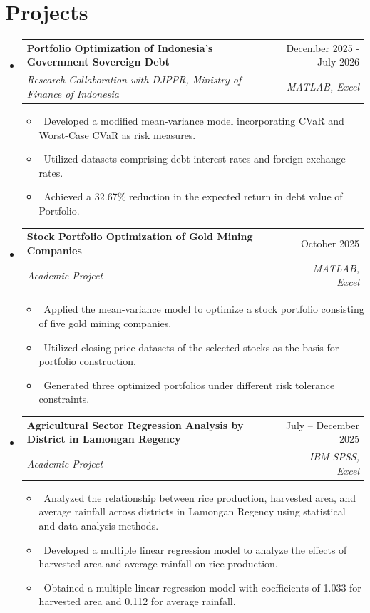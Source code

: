 \documentclass[letterpaper,10pt]{article}
\makeatletter
\newcommand{\resumeItem}[1]{\item\small{#1}}
\newcommand{\resumeSubheading}[4]{
\vspace{-1pt}\item
  \begin{tabular*}{0.97\textwidth}[t]{l@{\extracolsep{\fill}}r}
    \textbf{#1} & #2 \\
    \textit{#3} & \textit{#4} \\
  \end{tabular*}\vspace{-7pt}
}
\newcommand{\resumeSubHeadingList}{\begin{itemize}[leftmargin=0.15in, label={}]}
\newcommand{\resumeSubHeadingListEnd}{\end{itemize}}
\makeatother
\begin{document}
\section{Projects}
\resumeSubHeadingList
  \resumeSubheading
      {Portfolio Optimization of Indonesia's Government Sovereign Debt}{December 2025 - July 2026}
      {Research Collaboration with DJPPR, Ministry of Finance of Indonesia}{MATLAB, Excel}
      \resumeSubHeadingList
          \resumeItem{\textbullet\ Developed a modified mean-variance model incorporating CVaR and Worst-Case CVaR as risk measures.}
          \resumeItem{\textbullet\ Utilized datasets comprising debt interest rates and foreign exchange rates.}
          \resumeItem{\textbullet\ Achieved a 32.67\% reduction in the expected return in debt value of Portfolio.}
      \resumeSubHeadingListEnd
  \resumeSubheading
      {Stock Portfolio Optimization of Gold Mining Companies}{October 2025}
      {Academic Project}{MATLAB, Excel}
      \resumeSubHeadingList
          \resumeItem{\textbullet\ Applied the mean-variance model to optimize a stock portfolio consisting of five gold mining companies.}
          \resumeItem{\textbullet\ Utilized closing price datasets of the selected stocks as the basis for portfolio construction.}
          \resumeItem{\textbullet\ Generated three optimized portfolios under different risk tolerance constraints.}
      \resumeSubHeadingListEnd
  \resumeSubheading
      {Agricultural Sector Regression Analysis by District in Lamongan Regency}
      {July -- December 2025}
      {Academic Project}{IBM SPSS, Excel}
    \resumeSubHeadingList
        \resumeItem{\textbullet\ Analyzed the relationship between rice production, harvested area, and average rainfall across districts in Lamongan Regency using statistical and data analysis methods.}
        \resumeItem{\textbullet\ Developed a multiple linear regression model to analyze the effects of harvested area and average rainfall on rice production.}
       \resumeItem{\textbullet\ Obtained a multiple linear regression model with coefficients of 1.033 for harvested area and 0.112 for average rainfall.}
      \resumeSubHeadingListEnd
\resumeSubHeadingListEnd
\end{document}
